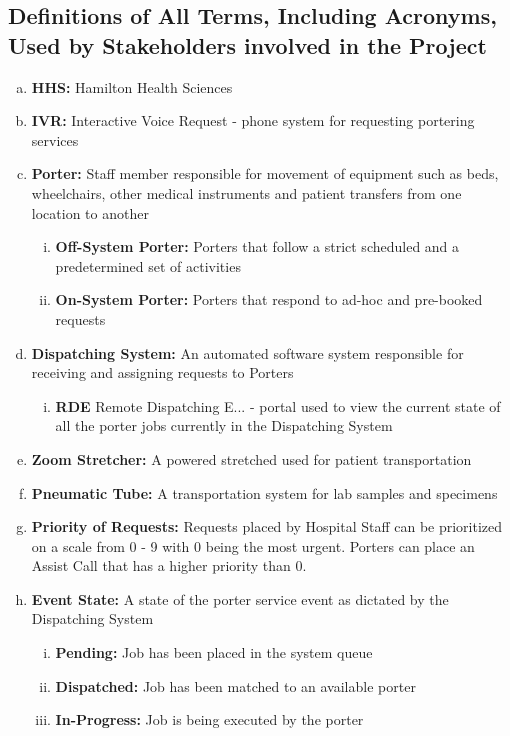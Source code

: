 \documentclass[paper=letter, fontsize=10pt]{scrartcl}
\numberwithin{equation}{section}		%
\numberwithin{figure}{section}			%
\numberwithin{table}{section}				%
\begin{document}
\subsection{Definitions of All Terms, Including Acronyms, Used by Stakeholders involved in the Project}
\begin{enumerate}[(a)]
	\item \textbf{HHS:} Hamilton Health Sciences
	\item \textbf{IVR:} Interactive Voice Request - phone system for requesting portering services
	\item \textbf{Porter:} Staff member responsible for movement of equipment such as beds, wheelchairs, other medical instruments and patient transfers from one location to another
	\begin{enumerate}[(i)]
		\item \textbf{Off-System Porter:} Porters that follow a strict scheduled and a predetermined set of activities
		\item \textbf{On-System Porter:} Porters that respond to ad-hoc and pre-booked requests	
	\end{enumerate}
	\item \textbf{Dispatching System:} An automated software system responsible for receiving and assigning requests to Porters
	\begin{enumerate}[(i)]
		\item \textbf{RDE} Remote Dispatching E... - portal used to view the current state of all the porter jobs currently in the Dispatching System
	\end{enumerate}
	\item \textbf{Zoom Stretcher:} A powered stretched used for patient transportation
	\item \textbf{Pneumatic Tube:} A transportation system for lab samples and specimens
	\item \textbf{Priority of Requests:} Requests placed by Hospital Staff can be prioritized on a scale from 0 - 9 with 0 being the most urgent. Porters can place an Assist Call that has a higher priority than 0.
	\item \textbf{Event State:} A state of the porter service event as dictated by the Dispatching System
	\begin{enumerate}[(i)]
		\item \textbf{Pending:} Job has been placed in the system queue
		\item \textbf{Dispatched:} Job has been matched to an available porter
		\item \textbf{In-Progress:} Job is being executed by the porter

\end{enumerate}
\end{enumerate}
\end{document}
